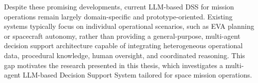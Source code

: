 Despite these promising developments, current LLM-based DSS for mission operations remain largely domain-specific and prototype-oriented. Existing systems typically focus on individual operational scenarios, such as EVA planning or spacecraft autonomy, rather than providing a general-purpose, multi-agent decision support architecture capable of integrating heterogeneous operational data, procedural knowledge, human oversight, and coordinated reasoning. This gap motivates the research presented in this thesis, which investigates a multi-agent LLM-based Decision Support System tailored for space mission operations. 




































